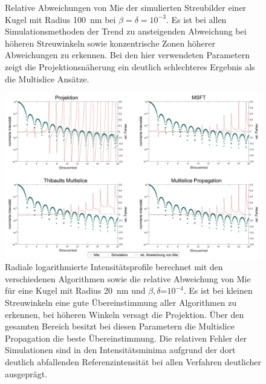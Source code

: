 \begin{figure}
\begin{subfigure}[b]{0.48\textwidth}
	\end{subfigure}
	\caption[Relativer Fehler der Simulationen]{Relative Abweichungen von Mie der simulierten Streubilder einer Kugel mit Radius \SI{100}{nm} bei $\beta=\delta=10^{-3}$. Es ist bei allen Simulationsmethoden der Trend zu ansteigenden Abweichung bei höheren Streuwinkeln sowie konzentrische Zonen höherer Abweichungen zu erkennen. Bei den hier verwendeten Parametern zeigt die Projektionsnäherung ein deutlich schlechteres Ergebnis als die Multislice Ansätze.}
	\label{fig:relerror}
\end{figure}

\clearpage
\begin{figure} %
	\centering
	\includegraphics[width=1\textwidth]{images/fig_sim_profile.pdf}
	\captionsetup{width=0.95\textwidth}
	\caption[Radiale Profile]{Radiale logarithmierte Intensitätsprofile berechnet mit den verschiedenen Algorithmen sowie die relative Abweichung von Mie für eine Kugel mit Radius \SI{20}{nm} und $\beta,\delta$=$10^{-4}$. Es ist bei kleinen Streuwinkeln eine gute Übereinstimmung aller Algorithmen zu erkennen, bei höheren Winkeln versagt die Projektion. Über den gesamten Bereich besitzt bei diesen Parametern die Multislice Propagation die beste Übereinstimmung. Die relativen Fehler der Simulationen sind in den Intensitätsminima aufgrund der dort deutlich abfallenden Referenzintensität bei allen Verfahren deutlicher ausgeprägt.}
	\label{fig:profil}
\end{figure}
\clearpage

